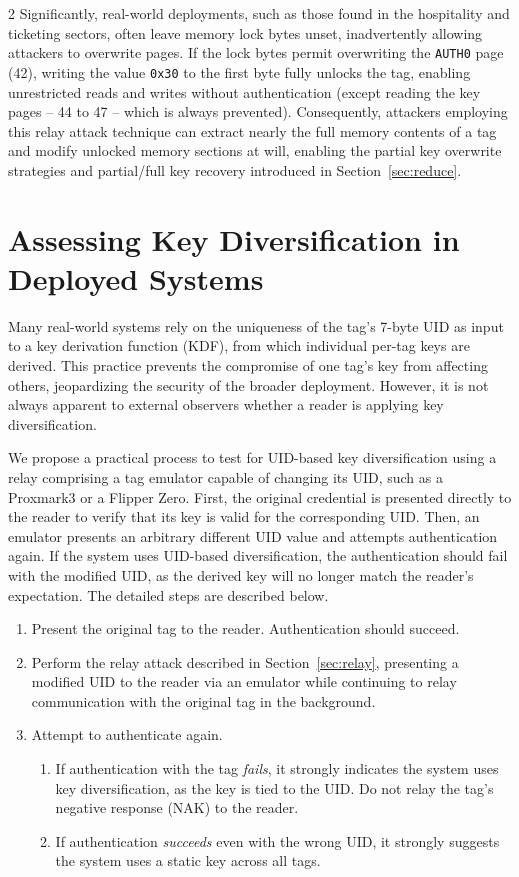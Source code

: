 \documentclass[10pt,letterpaper]{article}
\begin{document}
\begin{multicols}{2}
Significantly, real-world deployments, such as those found in the hospitality and ticketing sectors, often leave memory lock bytes unset, inadvertently allowing attackers to overwrite pages. If the lock bytes permit overwriting the \texttt{AUTH0} page (42), writing the value \texttt{0x30} to the first byte fully unlocks the tag, enabling unrestricted reads and writes without authentication (except reading the key pages -- 44 to 47 -- which is always prevented). Consequently, attackers employing this relay attack technique can extract nearly the full memory contents of a tag and modify unlocked memory sections at will, enabling the partial key overwrite strategies and partial/full key recovery introduced in Section~\ref{sec:reduce}.

\section{Assessing Key Diversification in Deployed Systems}
\label{sec:kdf}

Many real-world systems rely on the uniqueness of the tag's 7-byte UID as input to a key derivation function (KDF), from which individual per-tag keys are derived. This practice prevents the compromise of one tag's key from affecting others, jeopardizing the security of the broader deployment. However, it is not always apparent to external observers whether a reader is applying key diversification.

We propose a practical process to test for UID-based key diversification using a relay comprising a tag emulator capable of changing its UID, such as a Proxmark3 or a Flipper Zero.
First, the original credential is presented directly to the reader to verify that its key is valid for the corresponding UID. Then, an emulator presents an arbitrary different UID value and attempts authentication again. If the system uses UID-based diversification, the authentication should fail with the modified UID, as the derived key will no longer match the reader's expectation. The detailed steps are described below.

\begin{enumerate}
    \item Present the original tag to the reader. Authentication should succeed.
    \item Perform the relay attack described in Section~\ref{sec:relay}, presenting a modified UID to the reader via an emulator while continuing to relay communication with the original tag in the background.
    \item Attempt to authenticate again.
    \begin{enumerate}
        \item If authentication with the tag \emph{fails}, it strongly indicates the system uses key diversification, as the key is tied to the UID. Do not relay the tag's negative response (NAK) to the reader.
        \item If authentication \emph{succeeds} even with the wrong UID, it strongly suggests the system uses a static key across all tags.
    \end{enumerate}
\end{enumerate}


\end{multicols}
\end{document}
